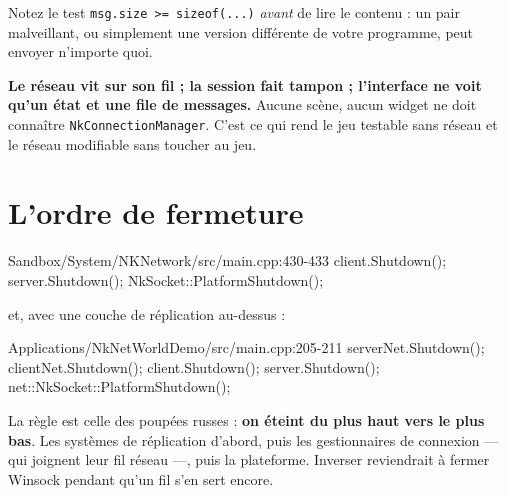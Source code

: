 Notez le test \texttt{msg.size >= sizeof(...)} \emph{avant} de lire le contenu :
un pair malveillant, ou simplement une version différente de votre programme,
peut envoyer n'importe quoi.

\begin{nkretenir}
\textbf{Le réseau vit sur son fil ; la session fait tampon ; l'interface ne voit
qu'un état et une file de messages.} Aucune scène, aucun widget ne doit connaître
\texttt{NkConnectionManager}. C'est ce qui rend le jeu testable sans réseau et le
réseau modifiable sans toucher au jeu.
\end{nkretenir}

\section{L'ordre de fermeture}

\begin{nkcode}{Sandbox/System/NKNetwork/src/main.cpp:430-433}
        client.Shutdown();
        server.Shutdown();
        NkSocket::PlatformShutdown();
\end{nkcode}

et, avec une couche de réplication au-dessus :

\begin{nkcode}{Applications/NkNetWorldDemo/src/main.cpp:205-211}
    serverNet.Shutdown();
    clientNet.Shutdown();
    client.Shutdown();
    server.Shutdown();
    net::NkSocket::PlatformShutdown();
\end{nkcode}

La règle est celle des poupées russes : \textbf{on éteint du plus haut vers le
plus bas}. Les systèmes de réplication d'abord, puis les gestionnaires de
connexion — qui joignent leur fil réseau —, puis la plateforme. Inverser
reviendrait à fermer Winsock pendant qu'un fil s'en sert encore.

